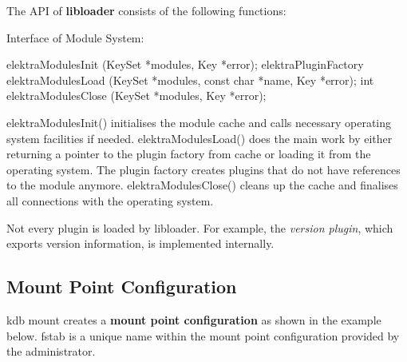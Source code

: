 The A\+P\+I of {\bfseries libloader} consists of the following functions\+:

Interface of Module System\+: \begin{DoxyVerb}    elektraModulesInit (KeySet *modules, Key *error); elektraPluginFactory
    elektraModulesLoad (KeySet *modules,
                    const char *name, Key *error);
    int elektraModulesClose (KeySet *modules, Key *error);
\end{DoxyVerb}


{\ttfamily elektra\+Modules\+Init()} initialises the module cache and calls necessary operating system facilities if needed. {\ttfamily elektra\+Modules\+Load()} does the main work by either returning a pointer to the plugin factory from cache or loading it from the operating system. The plugin factory creates plugins that do not have references to the module anymore. {\ttfamily elektra\+Modules\+Close()} cleans up the cache and finalises all connections with the operating system.

Not every plugin is loaded by {\ttfamily libloader}. For example, the {\itshape version plugin}, which exports version information, is implemented internally.

\subsection*{Mount Point Configuration}

{\ttfamily kdb mount} creates a {\bfseries mount point configuration} as shown in the example below. {\ttfamily fstab} is a unique name within the mount point configuration provided by the administrator.


